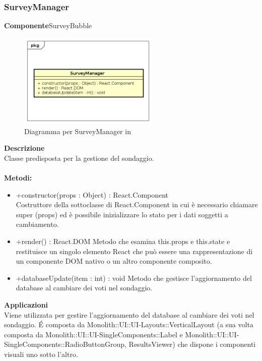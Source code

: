 \subsubsection{SurveyManager}
\textbf{Componente}SurveyBubble\\
   \FloatBarrier
   \begin{figure}[ht]
   \centering
   \includegraphics[width=0.6\textwidth]{img/single-SurveyManager}
   \caption{{Diagramma per SurveyManager in }}
\end{figure}
\FloatBarrier
\textbf{Descrizione}\\
Classe predisposta per la gestione del sondaggio.
\\
\\
\textbf{Metodi:} 
\begin{itemize}
\item +constructor(props : Object) : React.Component 
\\
Costruttore della sottoclasse di React.Component in cui è necessario chiamare super (props) ed è possibile inizializzare lo stato per i dati soggetti a cambiamento.

\item +render() : React.DOM
Metodo che esamina this.props e this.state e restituisce un singolo elemento React che può essere una rappresentazione di un componente DOM nativo o un altro componente composito.

\item +databaseUpdate(item : int) : void
Metodo che gestisce l'aggiornamento del database al cambiare dei voti nel sondaggio.
\end{itemize} 


\textbf{Applicazioni}\\
Viene utilizzata per gestire l'aggiornamento del database al cambiare dei voti nel sondaggio. \'E composta da Monolith::UI::UI-Layouts::VerticalLayout (a sua volta composta da Monolith::UI::UI-SingleComponents::Label e Monolith::UI::UI-SingleComponents::RadioButtonGroup, ResultsViewer) che dispone i componenti visuali uno sotto l'altro. 


